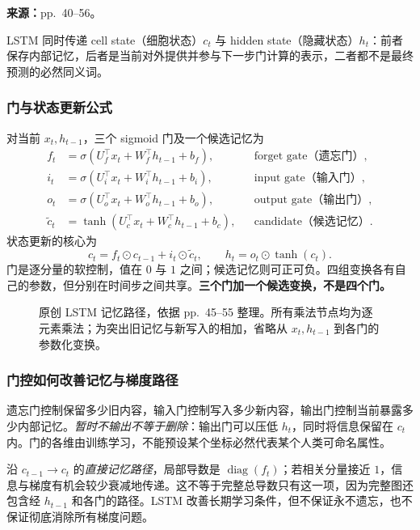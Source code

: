 \textbf{来源：}pp.~40--56。

LSTM 同时传递 cell state（细胞状态）$c_t$ 与 hidden state（隐藏状态）$h_t$：前者保存内部记忆，后者是当前对外提供并参与下一步门计算的表示，二者都不是最终预测的必然同义词。

\subsubsection{门与状态更新公式}

对当前 $x_t,h_{t-1}$，三个 sigmoid 门及一个候选记忆为
\[
\begin{aligned}
 f_t&=\sigma(U_f^\top x_t+W_f^\top h_{t-1}+b_f),
     &&\text{forget gate（遗忘门）},\\
 i_t&=\sigma(U_i^\top x_t+W_i^\top h_{t-1}+b_i),
     &&\text{input gate（输入门）},\\
 o_t&=\sigma(U_o^\top x_t+W_o^\top h_{t-1}+b_o),
     &&\text{output gate（输出门）},\\
 \tilde c_t&=\tanh(U_c^\top x_t+W_c^\top h_{t-1}+b_c),
     &&\text{candidate（候选记忆）}.
\end{aligned}
\]
状态更新的核心为
\[
 \boxed{c_t=f_t\odot c_{t-1}+i_t\odot\tilde c_t},\qquad
 \boxed{h_t=o_t\odot\tanh(c_t)}.
\]
门是逐分量的软控制，值在 $0$ 与 $1$ 之间；候选记忆则可正可负。四组变换各有自己的参数，但分别在时间步之间共享。\textbf{三个门加一个候选变换，不是四个门。}

\begin{figure}[htbp]
 \centering
 
 \caption{原创 LSTM 记忆路径，依据 pp.~45--55 整理。所有乘法节点均为逐元素乘法；为突出旧记忆与新写入的相加，省略从 $x_t,h_{t-1}$ 到各门的参数化变换。}
 \label{fig:sc4001-l08-memory}
\end{figure}

\subsubsection{门控如何改善记忆与梯度路径}

遗忘门控制保留多少旧内容，输入门控制写入多少新内容，输出门控制当前暴露多少内部记忆。\emph{暂时不输出不等于删除}：输出门可以压低 $h_t$，同时将信息保留在 $c_t$ 内。门的各维由训练学习，不能预设某个坐标必然代表某个人类可命名属性。

沿 $c_{t-1}\to c_t$ 的\emph{直接记忆路径}，局部导数是 $\operatorname{diag}(f_t)$；若相关分量接近 $1$，信息与梯度有机会较少衰减地传递。这不等于完整总导数只有这一项，因为完整图还包含经 $h_{t-1}$ 和各门的路径。LSTM 改善长期学习条件，但不保证永不遗忘，也不保证彻底消除所有梯度问题。

